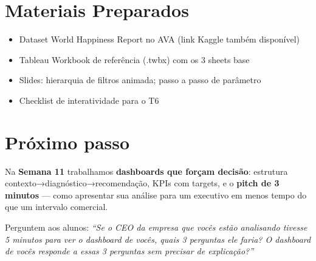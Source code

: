 \section{Materiais Preparados}
\begin{itemize}
  \item Dataset World Happiness Report no AVA (link Kaggle também disponível)
  \item Tableau Workbook de referência (.twbx) com os 3 sheets base
  \item Slides: hierarquia de filtros animada; passo a passo de parâmetro
  \item Checklist de interatividade para o T6
\end{itemize}

\section{Próximo passo}

Na \textbf{Semana 11} trabalhamos \textbf{dashboards que forçam decisão}:
estrutura contexto→diagnóstico→recomendação, KPIs com targets, e o
\textbf{pitch de 3 minutos} — como apresentar sua análise para um executivo
em menos tempo do que um intervalo comercial.

Perguntem aos alunos: \textit{``Se o CEO da empresa que vocês estão analisando
tivesse 5 minutos para ver o dashboard de vocês, quais 3 perguntas ele faria?
O dashboard de vocês responde a essas 3 perguntas sem precisar de explicação?''}
